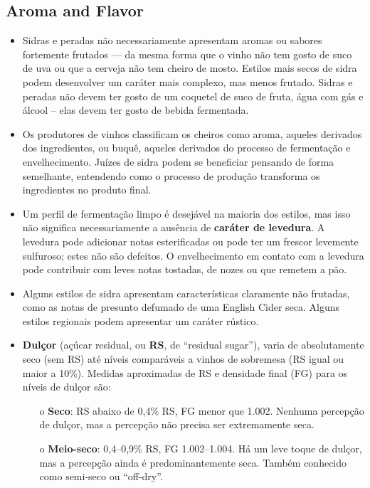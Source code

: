 \subsection*{Aroma and Flavor}

\begin{itemize}
\item Sidras e peradas não necessariamente apresentam aromas ou sabores fortemente frutados — da mesma forma que o vinho não tem gosto de suco de uva ou que a cerveja não tem cheiro de mosto. Estilos mais secos de sidra podem desenvolver um caráter mais complexo, mas menos frutado. Sidras e peradas não devem ter gosto de um coquetel de suco de fruta, água com gás e álcool – elas devem ter gosto de bebida fermentada.
\item Os produtores de vinhos classificam os cheiros como aroma, aqueles derivados dos ingredientes, ou buquê, aqueles derivados do processo de fermentação e envelhecimento. Juízes de sidra podem se beneficiar pensando de forma semelhante, entendendo como o processo de produção transforma os ingredientes no produto final.
\item Um perfil de fermentação limpo é desejável na maioria dos estilos, mas isso não significa necessariamente a ausência de \textbf{caráter de levedura}. A levedura pode adicionar notas esterificadas ou pode ter um frescor levemente sulfuroso; estes não são defeitos. O envelhecimento em contato com a levedura pode contribuir com leves notas tostadas, de nozes ou que remetem a pão.
\item Alguns estilos de sidra apresentam características claramente não frutadas, como as notas de presunto defumado de uma English Cider seca. Alguns estilos regionais podem apresentar um caráter rústico.
\item \textbf{Dulçor} (açúcar residual, ou \textbf{RS}, de “residual sugar”), varia de absolutamente seco (sem RS) até níveis comparáveis a vinhos de sobremesa (RS igual ou maior a 10\%). Medidas aproximadas de RS e densidade final (FG) para os níveis de dulçor são:
  \begin{itemize}
  \item[o] \textbf{Seco}: RS abaixo de 0,4\% RS, FG menor que 1.002. Nenhuma percepção de dulçor, mas a percepção não precisa ser extremamente seca.
  \item[o] \textbf{Meio-seco}: 0,4–0,9\% RS, FG 1.002–1.004. Há um leve toque de dulçor, mas a percepção ainda é predominantemente seca. Também conhecido como semi-seco ou “off-dry”.

\end{itemize}
\end{itemize}
